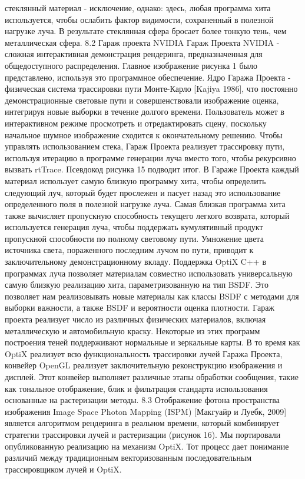 стеклянный материал - исключение, однако: здесь, любая программа хита используется, чтобы ослабить фактор видимости, сохраненный в полезной нагрузке луча. В результате стеклянная сфера бросает более тонкую тень, чем металлическая сфера.
8.2 Гараж проекта NVIDIA
Гараж Проекта NVIDIA - сложная интерактивная демонстрация рендеринга, предназначенная для общедоступного распределения. Главное изображение рисунка 1 было представлено, используя это программное обеспечение. Ядро Гаража Проекта - физическая система трассировки пути Монте-Карло [Kajiya 1986], что постоянно демонстрационные световые пути и совершенствовали изображение
оценка, интегрируя новые выборки в течение долгого времени. Пользователь может в интерактивном режиме просмотреть и отредактировать сцену, поскольку начальное шумное изображение сходится к окончательному решению.
Чтобы управлять использованием стека, Гараж Проекта реализует трассировку пути, используя итерацию в программе генерации луча вместо того, чтобы рекурсивно вызвать rtTrace. Псевдокод рисунка 15 подводит итог.
В Гараже Проекта каждый материал использует самую близкую программу хита, чтобы определить следующий луч, который будет прослежен и пасует назад это использование определенного поля в полезной нагрузке луча. Самая близкая программа хита также вычисляет пропускную способность текущего легкого возврата, который используется
генерация луча, чтобы поддержать кумулятивный продукт пропускной способности по полному световому пути. Умножение цвета источника света, пораженного последним лучом по пути, приводит к заключительному демонстрационному вкладу.
Поддержка OptiX C++ в программах луча позволяет материалам совместно использовать универсальную самую близкую реализацию хита, параметризованную на тип BSDF. Это позволяет нам реализовывать новые материалы как классы BSDF с методами для выборки важности, а также BSDF и вероятности
оценка плотности. Гараж проекта реализует число
из различных физических материалов, включая металлическую и автомобильную краску. Некоторые из этих программ построения теней поддерживают нормальные и зеркальные карты.
В то время как OptiX реализует всю функциональность трассировки лучей Гаража Проекта, конвейер OpenGL реализует заключительную реконструкцию изображения и дисплей. Этот конвейер выполняет различные этапы обработки сообщения, такие как тональное отображение, блик и фильтрация стандарта использования основанные на растеризации методы.
8.3 Отображение фотона пространства изображения
Image Space Photon Mapping (ISPM) [Макгуайр и Луебк, 2009] является алгоритмом рендеринга в реальном времени, который комбинирует стратегии трассировки лучей и растеризации (рисунок 16). Мы портировали опубликованную реализацию на механизм OptiX. Тот процесс дает понимание различий между традиционным векторизованным последовательным трассировщиком лучей и OptiX.
